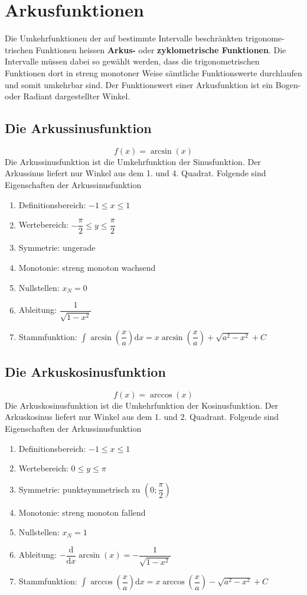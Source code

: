 \section{Arkusfunktionen}
Die Umkehrfunktionen der auf bestimmte Intervalle beschränkten trigonome-trischen Funktionen heissen \textbf{Arkus-} oder \textbf{zyklometrische Funktionen}. Die Intervalle müssen dabei so gewählt werden, dass die trigonometrischen Funktionen dort in streng monotoner Weise sämtliche Funktionswerte durchlaufen und somit umkehrbar sind. Der Funktionswert einer Arkusfunktion ist ein Bogen- oder Radiant dargestellter Winkel.
\subsection{Die Arkussinusfunktion}
\begin{equation}
\boxed{f\left(x\right)=\arcsin\left(x\right)}
\end{equation}
Die Arkussinusfunktion ist die Umkehrfunktion der Sinusfunktion. Der Arkussinus liefert nur Winkel aus dem 1. und 4. Quadrat. Folgende sind Eigenschaften der Arkussinusfunktion
\begin{enumerate}[$(a)$]
\item Definitionsbereich: $-1\leq x \leq 1$
\item Wertebereich: $-\dfrac{\pi}{2}\leq y\leq \dfrac{\pi}{2}$
\item Symmetrie: ungerade
\item Monotonie: streng monoton wachsend
\item Nullstellen: $x_N=0$
\item Ableitung: $\dfrac{1}{\sqrt{1-x^2}}$
\item Stammfunktion: $\displaystyle \int \arcsin\left(\dfrac{x}{a}\right)\text{d}x=x\arcsin\left(\dfrac{x}{a}\right)+\sqrt{a^2-x^2}+C$
\end{enumerate} 
\subsection{Die Arkuskosinusfunktion}
\begin{equation}
\boxed{f\left(x\right)=\arccos\left(x\right)}
\end{equation}
Die Arkuskosinusfunktion ist die Umkehrfunktion der Kosinusfunktion. Der Arkuskosinus liefert nur Winkel aus dem 1. und 2. Quadrant. Folgende sind Eigenschaften der Arkussinusfunktion
\begin{enumerate}[$(a)$]
\item Definitionsbereich: $-1\leq x \leq 1$
\item Wertebereich: $0\leq y\leq \pi$
\item Symmetrie: punktsymmetrisch zu $\left(0; \dfrac{\pi}{2}\right)$
\item Monotonie: streng monoton fallend
\item Nullstellen: $x_N=1$
\item Ableitung: $-\dfrac{\text{d}}{\text{d}x}\arcsin\left(x\right)=-\dfrac{1}{\sqrt{1-x^2}}$
\item Stammfunktion: $\displaystyle \int \arccos\left(\dfrac{x}{a}\right)\text{d}x=x\arccos\left(\dfrac{x}{a}\right)-\sqrt{a^2-x^2}+C$
\end{enumerate} 
